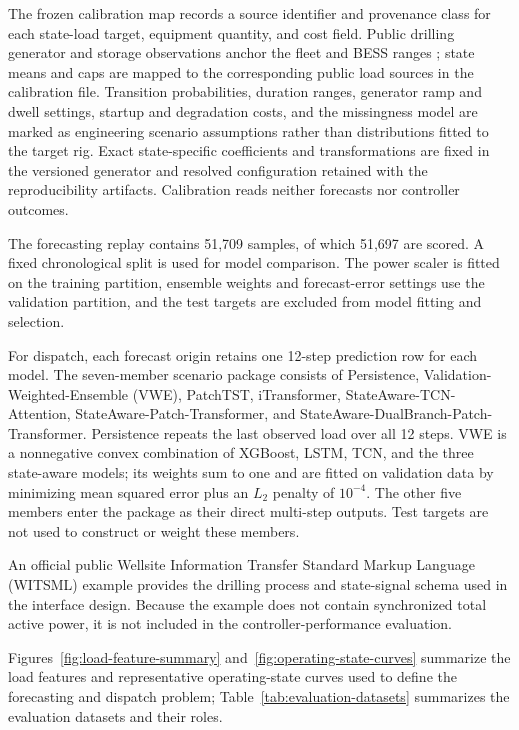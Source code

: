 The frozen calibration map records a source identifier and provenance class
for each state-load target, equipment quantity, and cost field. Public drilling
generator and storage observations anchor the fleet and BESS ranges
\citep{pavkovic2016oil,chupin2021drillingstorage}; state means and caps are
mapped to the corresponding public load sources in the calibration file.
Transition probabilities, duration ranges, generator ramp and dwell settings,
startup and degradation costs, and the missingness model are marked as
engineering scenario assumptions rather than distributions fitted to the
target rig. Exact state-specific coefficients and transformations are fixed in
the versioned generator and resolved configuration retained with the
reproducibility artifacts. Calibration reads neither forecasts nor controller
outcomes.

The forecasting replay contains 51,709 samples, of which 51,697 are scored.
A fixed chronological split is used for model comparison. The power scaler
is fitted on the training partition, ensemble weights and forecast-error
settings use the validation partition, and the test targets are excluded from
model fitting and selection.

For dispatch, each forecast origin retains one 12-step prediction row for
each model. The seven-member scenario package consists of Persistence,
Validation-Weighted-Ensemble (VWE), PatchTST, iTransformer,
StateAware-TCN-Attention, StateAware-Patch-Transformer, and
StateAware-DualBranch-Patch-Transformer. Persistence repeats the last observed
load over all 12 steps. VWE is a nonnegative convex combination of XGBoost,
LSTM, TCN, and the three state-aware models; its weights sum to one and are
fitted on validation data by minimizing mean squared error plus an
$L_2$ penalty of $10^{-4}$. The other five members enter the package as their
direct multi-step outputs. Test targets are not used to construct or weight
these members.

An official public Wellsite Information Transfer Standard Markup Language
(WITSML) example provides the drilling process and state-signal schema used in
the interface design. Because the example does not contain synchronized total
active power, it is not included in the controller-performance evaluation.

Figures~\ref{fig:load-feature-summary} and~\ref{fig:operating-state-curves}
summarize the load features and representative operating-state curves used to
define the forecasting and dispatch problem; Table~\ref{tab:evaluation-datasets}
summarizes the evaluation datasets and their roles.

